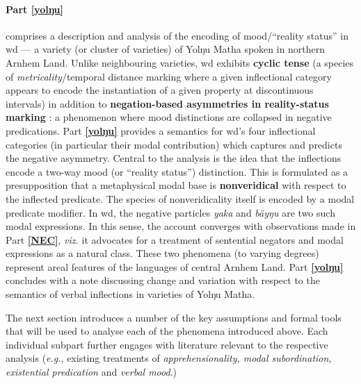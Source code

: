 \documentclass[12pt,dvipsnames]{report}
\begin{document}
 
\paragraph{Part \ref{yolŋu}} comprises a description and analysis of the encoding of mood/``reality status'' in \acrfull{wd} --- a variety (or cluster of varieties) of Yolŋu Matha spoken in northern Arnhem Land. Unlike neighbouring varieties, \gls{wd} exhibits \textbf{cyclic tense} (a species of \textit{metricality}/temporal distance marking where a given inflectional category appears to encode the instantiation of a given property at discontinuous intervals) in addition to \textbf{negation-based asymmetries in reality-status marking} \citep[\textit{cf.}][]{Miestamo2005}: a phenomenon where mood distinctions are collapsed in negative predications. Part \textbf{\ref{yolŋu}} provides a semantics for \acrshort{wd}'s four inflectional categories (in particular their modal contribution) which captures and predicts the negative asymmetry. Central to the analysis is the idea that the inflections encode a two-way mood (or ``reality status'') distinction. This is formulated as a presupposition that a metaphysical modal base is \textbf{nonveridical} with respect to the inflected predicate. The species of nonveridicality itself is encoded by a modal predicate modifier. In \gls{wd}, the negative particles \textit{yaka} and \textit{bäyŋu} are two such modal expressions. In this sense, the account converges with observations made in Part \textbf{\ref{NEC}}, \textit{viz.} it advocates for a treatment of sentential negators and modal expressions as a natural class. These two phenomena (to varying degrees) represent areal features of the languages of central Arnhem Land. Part \textbf{\ref{yolŋu}} concludes with a note discussing change and variation with respect to the semantics of verbal inflections in varieties of Yolŋu Matha.


The next section introduces a number of the key assumptions and formal tools that will be used to analyse each of the phenomena introduced above. Each individual subpart further engages with literature relevant to the respective analysis (\textit{e.g.}, existing treatments of \textit{apprehensionality, modal subordination, existential predication} and \textit{verbal mood}.)
\end{document}

